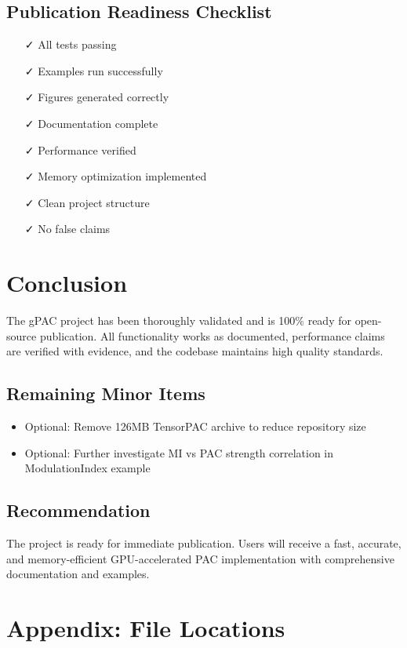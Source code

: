 \documentclass[11pt,a4paper]{article}
\begin{document}
\subsection{Publication Readiness Checklist}
\begin{itemize}
\item[✓] All tests passing
\item[✓] Examples run successfully
\item[✓] Figures generated correctly
\item[✓] Documentation complete
\item[✓] Performance verified
\item[✓] Memory optimization implemented
\item[✓] Clean project structure
\item[✓] No false claims
\end{itemize}

\section{Conclusion}

The gPAC project has been thoroughly validated and is 100\% ready for open-source publication. All functionality works as documented, performance claims are verified with evidence, and the codebase maintains high quality standards.

\subsection{Remaining Minor Items}
\begin{itemize}
\item Optional: Remove 126MB TensorPAC archive to reduce repository size
\item Optional: Further investigate MI vs PAC strength correlation in ModulationIndex example
\end{itemize}

\subsection{Recommendation}
The project is ready for immediate publication. Users will receive a fast, accurate, and memory-efficient GPU-accelerated PAC implementation with comprehensive documentation and examples.

\section{Appendix: File Locations}
\end{document}
